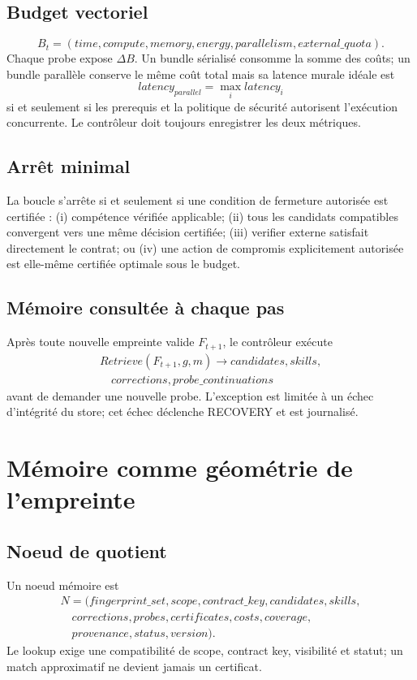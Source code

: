 \documentclass[11pt,a4paper]{report}
\begin{document}
\section{Budget vectoriel}
\[
B_t=(time,compute,memory,energy,parallelism,external\_quota).
\]
Chaque probe expose $\Delta B$. Un bundle sérialisé consomme la somme des coûts; un bundle parallèle conserve le même coût total mais sa latence murale idéale est
\[
latency_{parallel}=\max_i latency_i
\]
si et seulement si les prerequis et la politique de sécurité autorisent l'exécution concurrente. Le contrôleur doit toujours enregistrer les deux métriques.

\section{Arrêt minimal}
La boucle s'arrête si et seulement si une condition de fermeture autorisée est certifiée : (i) compétence vérifiée applicable; (ii) tous les candidats compatibles convergent vers une même décision certifiée; (iii) verifier externe satisfait directement le contrat; ou (iv) une action de compromis explicitement autorisée est elle-même certifiée optimale sous le budget.

\section{Mémoire consultée à chaque pas}
Après toute nouvelle empreinte valide $F_{t+1}$, le contrôleur exécute
\[
\begin{aligned}
Retrieve(F_{t+1},g,m)\to candidates,skills,\\
\quad corrections,probe\_continuations
\end{aligned}
\]
avant de demander une nouvelle probe. L'exception est limitée à un échec d'intégrité du store; cet échec déclenche RECOVERY et est journalisé.

\chapter{Mémoire comme géométrie de l'empreinte}
\section{Noeud de quotient}
Un noeud mémoire est
\[
\begin{aligned}
N=(fingerprint\_set,scope,contract\_key,candidates,skills,\\
\quad corrections,probes,certificates,costs,coverage,\\
\quad provenance,status,version).
\end{aligned}
\]
Le lookup exige une compatibilité de scope, contract key, visibilité et statut; un match approximatif ne devient jamais un certificat.
\end{document}
